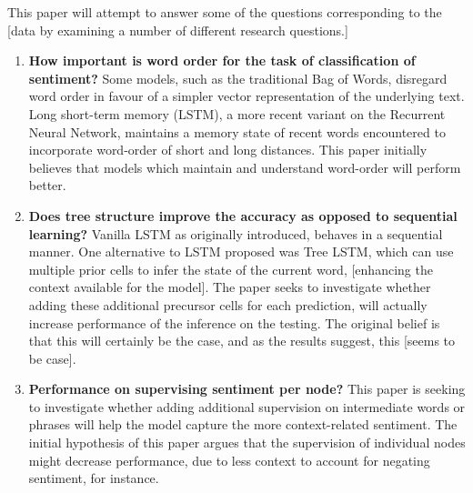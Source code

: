 This paper will attempt to answer some of the questions corresponding to the
[data by examining a number of different research questions.]
\begin{enumerate}
    \item \textbf{How important is word order for the task of classification of
    sentiment?} Some models, such as the traditional Bag of Words, disregard
    word order in favour of a simpler vector representation of the underlying
    text. Long short-term memory (LSTM), a more recent variant on the Recurrent
    Neural Network, maintains a memory state of recent words encountered to
    incorporate word-order of short and long distances. This paper initially
    believes that models which maintain and understand word-order will perform
    better. 
    \item \textbf{Does tree structure improve the accuracy as opposed to
    sequential learning?} Vanilla LSTM as originally introduced, behaves in a
    sequential manner. One alternative to LSTM proposed was Tree LSTM, which can
    use multiple prior cells to infer the state of the current word, [enhancing
    the context available for the model]. The paper seeks to investigate whether
    adding these additional precursor cells for each prediction, will actually
    increase performance of the inference on the testing. The original belief is
    that this will certainly be the case, and as the results suggest, this
    [seems to be case].
    \item \textbf{Performance on supervising sentiment per node?}
    This paper is seeking to investigate whether adding additional supervision
    on intermediate words or phrases will help the model capture the more
    context-related sentiment. The initial hypothesis of this paper argues
    that the supervision of individual nodes might decrease performance, due to
    less context to account for negating sentiment, for instance.

\end{enumerate}

